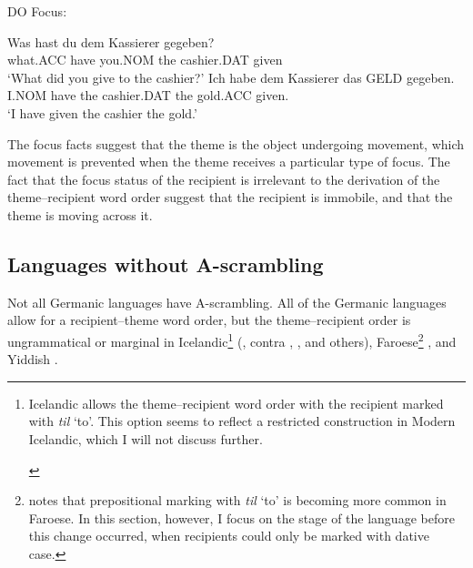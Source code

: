 \begin{exe}
\ex DO Focus:
\begin{xlist}
\ex \gll Was hast du dem Kassierer gegeben?\\
what.ACC have you.NOM the cashier.DAT given\\
\trans `What did you give to the cashier?'
\ex \gll Ich habe dem Kassierer das GELD gegeben.\\
I.NOM have the cashier.DAT the gold.ACC given.\\
\trans `I have given the cashier the gold.'
\end{xlist}
\end{exe}

The focus facts suggest that the theme is the object undergoing movement, which movement is prevented when the theme receives a particular type of focus. The fact that the focus status of the recipient is irrelevant to the derivation of the theme--recipient word order suggest that the recipient is immobile, and that the theme is moving across it.

\subsection{Languages without A-scrambling}
Not all Germanic languages have A-scrambling. All of the Germanic languages allow for a recipient--theme word order, but the theme--recipient order is ungrammatical or marginal in Icelandic\footnote{Icelandic allows the theme--recipient word order with the recipient marked with \emph{til} `to'. This option seems to reflect a restricted construction in Modern Icelandic, which I will not discuss further.
\begin{exe}
\ex \label{ex:icetil} \cite{Ottosson.1993} 
\begin{xlist} 
\end{xlist}
\end{exe}
} (\cite{Dehe.2004}, contra \cite{Falk.1990}, \cite{Ottosson.1993}, and others), Faroese\footnote{\cite{Lundquist.2013b} notes that prepositional marking with \emph{til} `to' is becoming more common in Faroese. In this section, however, I focus on the stage of the language before this change occurred, when recipients could only be marked with dative case.} \citep{Lundquist.2013b}, and Yiddish \citep{Birnbaum.1979}.

